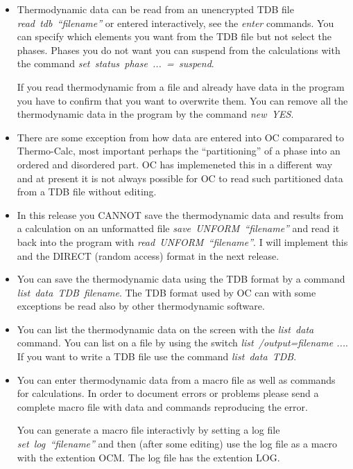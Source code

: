 \documentclass[12pt]{article}
\begin{document}
\begin{itemize}
\item Thermodynamic data can be read from an unencrypted TDB file {\em
  read~tdb~``filename''} or entered interactively, see the {\em enter}
  commands.  You can specify which elements you want from the TDB file
  but not select the phases.  Phases you do not want you can suspend
  from the calculations with the command {\em
    set~status~phase~...~=~suspend}.

  If you read thermodynamic from a file and already have data in the
  program you have to confirm that you want to overwrite them.  You can
  remove all the thermodynamic data in the program by the command {\em
    new~YES}.

\item There are some exception from how data are entered into OC
  comparared to Thermo-Calc, most important perhaps the
  ``partitioning'' of a phase into an ordered and disordered part.  OC
  has implemeneted this in a different way and at present it is not
  always possible for OC to read such partitioned data from a TDB file
  without editing.

\item In this release you CANNOT save the thermodynamic data and
  results from a calculation on an unformatted file {\em
    save~UNFORM~``filename''} and read it back into the program with
  {\em read~UNFORM~``filename''}.  I will implement this and the
  DIRECT (random access) format in the next release.

\item You can save the thermodynamic data using the TDB format by a
  command {\em list~data~TDB~filename}.  The TDB format used by OC can
  with some exceptions be read also by other thermodynamic software.

\item You can list the thermodynamic data on the screen with the {\em
  list~data} command.  You can list on a file by using the switch {\em
  list~/output=filename ...}.  If you want to write a TDB file use the
  command {\em list~data~TDB}.
  
\item You can enter thermodynamic data from a macro file as well as
  commands for calculations.  In order to document errors or problems
  please send a complete macro file with data and commands reproducing
  the error.  

  You can generate a macro file interactivly by setting a log file
  {\em set~log~``filename''} and then (after some editing) use the log
  file as a macro with the extention OCM.  The log file has the
  extention LOG.

\end{itemize}
\end{document}
